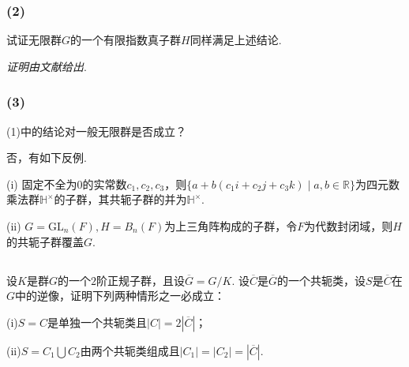 \subsubsection{(2)}
试证无限群$G$的一个有限指数真子群$H$同样满足上述结论.

\emph{证明由文献}\cite{groupprops}\emph{给出}.


\subsubsection{(3)}
(1)中的结论对一般无限群是否成立？

\jie 否，有如下反例.

(i) 固定不全为$0$的实常数$c_1, c_2, c_3$，则$\{a+b(c_1i+c_2j+c_3k)\mid a,b\in\mathbb{R}\}$为四元数乘法群$\mathbb{H}^{\times}$的子群，其共轭子群的并为$\mathbb{H}^{\times}$.

(ii) $G=\mathrm{GL}_n(F), H=B_n(F)$为上三角阵构成的子群，令$F$为代数封闭域，则$H$的共轭子群覆盖$G$.

\subsection{}
设$K$是群$G$的一个$2$阶正规子群，且设$\overline{G}=G/K$. 设$\overline{C}$是$\overline{G}$的一个共轭类，设$S$是$\overline{C}$在$G$中的逆像，证明下列两种情形之一必成立：

(i)$S=C$是单独一个共轭类且$|C|=2|\overline{C}|$；

(ii)$S=C_1\bigcup C_2$由两个共轭类组成且$|C_1|=|C_2|=|\overline{C}|$.

